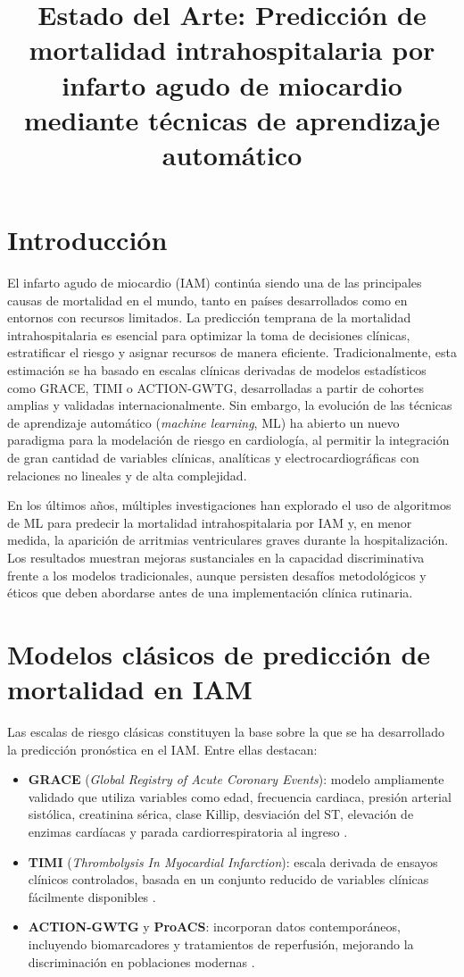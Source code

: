 \documentclass[12pt,a4paper]{article}
\title{Estado del Arte: Predicción de mortalidad intrahospitalaria por infarto agudo de miocardio mediante técnicas de aprendizaje automático}
\author{}
\date{}
\begin{document}
\maketitle

\section{Introducción}
El infarto agudo de miocardio (IAM) continúa siendo una de las principales causas de mortalidad en el mundo, tanto en países desarrollados como en entornos con recursos limitados. La predicción temprana de la mortalidad intrahospitalaria es esencial para optimizar la toma de decisiones clínicas, estratificar el riesgo y asignar recursos de manera eficiente. Tradicionalmente, esta estimación se ha basado en escalas clínicas derivadas de modelos estadísticos como GRACE, TIMI o ACTION-GWTG, desarrolladas a partir de cohortes amplias y validadas internacionalmente. Sin embargo, la evolución de las técnicas de aprendizaje automático (\textit{machine learning}, ML) ha abierto un nuevo paradigma para la modelación de riesgo en cardiología, al permitir la integración de gran cantidad de variables clínicas, analíticas y electrocardiográficas con relaciones no lineales y de alta complejidad.

En los últimos años, múltiples investigaciones han explorado el uso de algoritmos de ML para predecir la mortalidad intrahospitalaria por IAM y, en menor medida, la aparición de arritmias ventriculares graves durante la hospitalización. Los resultados muestran mejoras sustanciales en la capacidad discriminativa frente a los modelos tradicionales, aunque persisten desafíos metodológicos y éticos que deben abordarse antes de una implementación clínica rutinaria.

\section{Modelos clásicos de predicción de mortalidad en IAM}
Las escalas de riesgo clásicas constituyen la base sobre la que se ha desarrollado la predicción pronóstica en el IAM. Entre ellas destacan:

\begin{itemize}
  \item \textbf{GRACE} (\textit{Global Registry of Acute Coronary Events}): modelo ampliamente validado que utiliza variables como edad, frecuencia cardiaca, presión arterial sistólica, creatinina sérica, clase Killip, desviación del ST, elevación de enzimas cardíacas y parada cardiorrespiratoria al ingreso \citep{fox2006grace}.
  \item \textbf{TIMI} (\textit{Thrombolysis In Myocardial Infarction}): escala derivada de ensayos clínicos controlados, basada en un conjunto reducido de variables clínicas fácilmente disponibles \citep{antman2000timi}.
  \item \textbf{ACTION-GWTG} y \textbf{ProACS}: incorporan datos contemporáneos, incluyendo biomarcadores y tratamientos de reperfusión, mejorando la discriminación en poblaciones modernas \citep{morrow2013action, pinto2015proacs}.
\end{itemize}
\end{document}
